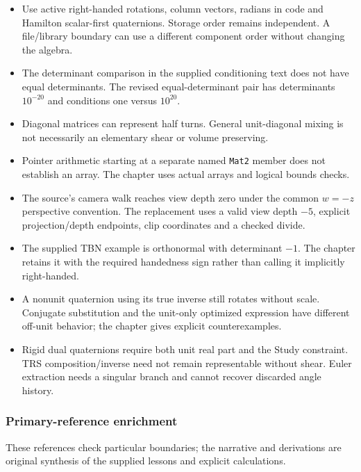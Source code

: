 \begin{itemize}
\tightlist
\item
  Use active right-handed rotations, column vectors, radians in code and Hamilton scalar-first quaternions. Storage order remains independent. A file/library boundary can use a different component order without changing the algebra.
\item
  The determinant comparison in the supplied conditioning text does not have equal determinants. The revised equal-determinant pair has determinants \(10^{-20}\) and conditions one versus \(10^{20}\).
\item
  Diagonal matrices can represent half turns. General unit-diagonal mixing is not necessarily an elementary shear or volume preserving.
\item
  Pointer arithmetic starting at a separate named \texttt{Mat2} member does not establish an array. The chapter uses actual arrays and logical bounds checks.
\item
  The source's camera walk reaches view depth zero under the common \(w=-z\) perspective convention. The replacement uses a valid view depth \(-5\), explicit projection/depth endpoints, clip coordinates and a checked divide.
\item
  The supplied TBN example is orthonormal with determinant \(-1\). The chapter retains it with the required handedness sign rather than calling it implicitly right-handed.
\item
  A nonunit quaternion using its true inverse still rotates without scale. Conjugate substitution and the unit-only optimized expression have different off-unit behavior; the chapter gives explicit counterexamples.
\item
  Rigid dual quaternions require both unit real part and the Study constraint. TRS composition/inverse need not remain representable without shear. Euler extraction needs a singular branch and cannot recover discarded angle history.
\end{itemize}

\subsubsection{Primary-reference enrichment}\label{appendix-a103e7846d21-primary-reference-enrichment}

\hypertarget{appendix-a103e7846d21-primary-reference-enrichment}{}

These references check particular boundaries; the narrative and derivations are original synthesis of the supplied lessons and explicit calculations.

